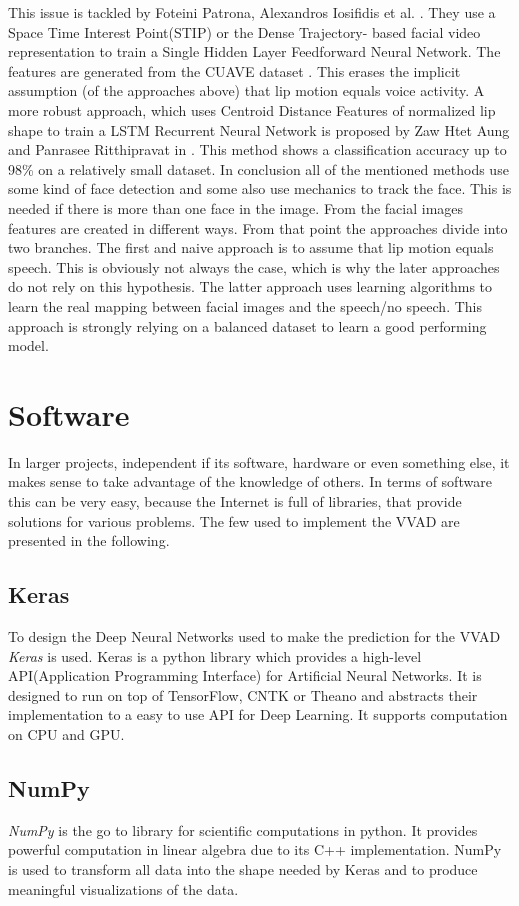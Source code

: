 This issue is tackled by Foteini Patrona, Alexandros Iosifidis et al. \cite{Patrona2016}.
They use a Space Time Interest Point(STIP) or the Dense Trajectory-
based facial video representation to train a Single Hidden Layer Feedforward Neural Network.
The features are generated from the CUAVE dataset \cite{Patterson2002}.
This erases the implicit assumption (of the approaches above) that lip motion equals voice activity.
A more robust approach, which uses Centroid Distance Features of normalized lip shape to train a LSTM Recurrent Neural Network is proposed by Zaw Htet Aung and Panrasee Ritthipravat in \cite{Aung2015}. This method shows a classification accuracy up to 98\% on a relatively small dataset.
In conclusion all of the mentioned methods use some kind of face detection and some also use mechanics to track the face. This is needed if there is more than one face in the image.
From the facial images features are created in different ways. From that point the approaches divide into two branches.
The first and naive approach is to assume that lip motion equals speech. This is obviously not always the case, which is why the later approaches do not rely on this hypothesis.
The latter approach uses learning algorithms to learn the real mapping between facial images and the speech/no speech. This approach is strongly relying on a balanced dataset to learn a good performing model.

\section{Software}
\label{sec:software}
In larger projects, independent if its software, hardware or even something else, it makes sense to
take advantage of the knowledge of others.
In terms of software this can be very easy, because the Internet is full of libraries, that provide solutions for various problems.
The few used to implement the VVAD are presented in the following.
\subsection{Keras}
To design the Deep Neural Networks used to make the prediction for the VVAD \emph{Keras}\cite{Keras} is used.
Keras is a python library which provides a high-level API(Application Programming Interface) for Artificial Neural Networks. It is designed to run on top of TensorFlow, CNTK or Theano and abstracts their implementation to a easy to use API for Deep Learning. 
It supports computation on CPU and GPU.
\subsection{NumPy}
\emph{NumPy}\cite{NumPy} is the go to library for scientific computations in python.
It provides powerful computation in linear algebra due to its C++ implementation. 
NumPy is used to transform all data into the shape needed by Keras and to produce meaningful visualizations of the data.  
